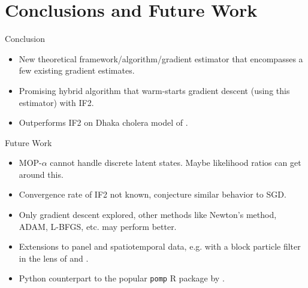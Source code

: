 \documentclass{beamer}
\begin{document}
\section{Conclusions and Future Work}

\begin{frame}{Conclusion}
    \begin{itemize}
        \item New theoretical framework/algorithm/gradient estimator that encompasses a few existing gradient estimates.
        \item \pause Promising hybrid algorithm that warm-starts gradient descent (using this estimator) with IF2.
        \item \pause Outperforms IF2 on Dhaka cholera model of \cite{king15}.
    \end{itemize}
\end{frame}


\begin{frame}{Future Work}
    \begin{itemize}
        \item MOP-$\alpha$ cannot handle discrete latent states. Maybe likelihood ratios can get around this.
        \item \pause Convergence rate of IF2 not known, conjecture similar behavior to SGD. 
        \item \pause Only gradient descent explored, other methods like Newton's method, ADAM, L-BFGS, etc. may perform better.
        \item \pause Extensions to panel and spatiotemporal data, e.g. with a block particle filter in the lens of \cite{ionides22} and \cite{ning23}.
        \item \pause Python counterpart to the popular \texttt{pomp} R package by \citet{king16, king2017pompmanual}.
    \end{itemize}
\end{frame}




\end{document}
